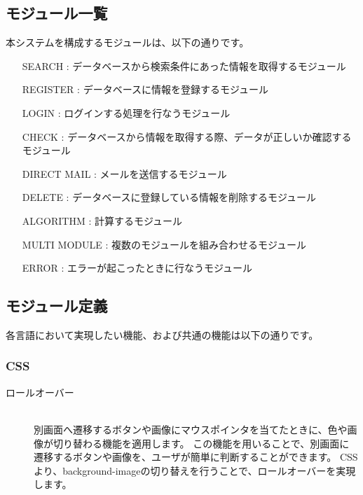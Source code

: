 \documentclass[a4j,titlepage]{jarticle}
\begin{document}
\subsection{モジュール一覧}
本システムを構成するモジュールは、以下の通りです。
\begin{enumerate}
\item [SEARCH] : データベースから検索条件にあった情報を取得するモジュール
\item [REGISTER] : データベースに情報を登録するモジュール
\item [LOGIN] : ログインする処理を行なうモジュール
\item [CHECK] : データベースから情報を取得する際、データが正しいか確認するモジュール
\item [DIRECT MAIL] : メールを送信するモジュール
\item [DELETE] : データベースに登録している情報を削除するモジュール
\item [ALGORITHM] : 計算するモジュール
\item [MULTI MODULE] : 複数のモジュールを組み合わせるモジュール
\item [ERROR] : エラーが起こったときに行なうモジュール
\end{enumerate}

\clearpage

\subsection{モジュール定義}
各言語において実現したい機能、および共通の機能は以下の通りです。
\subsubsection{CSS}
\begin{description}
\item[ロールオーバー]~\\
別画面へ遷移するボタンや画像にマウスポインタを当てたときに、色や画像が切り替わる機能を適用します。
この機能を用いることで、別画面に遷移するボタンや画像を、ユーザが簡単に判断することができます。
CSSより、background-imageの切り替えを行うことで、ロールオーバーを実現します。
\end{description}
\end{document}
